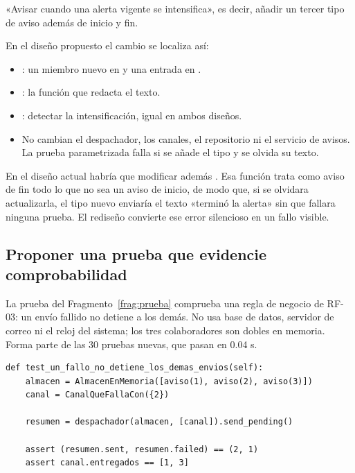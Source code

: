 \documentclass[11pt,a4paper]{article}
\begin{document}
 «Avisar cuando una alerta vigente se intensifica», es decir, añadir un tercer tipo de aviso además de inicio y fin.

En el diseño propuesto el cambio se localiza así:
\begin{itemize}
  \item {}: un miembro nuevo en  y una entrada en .
  \item {}: la función que redacta el texto.
  \item {}: detectar la intensificación, igual en ambos diseños.
  \item No cambian el despachador, los canales, el repositorio ni el servicio de avisos. La prueba parametrizada  falla si se añade el tipo y se olvida su texto.
\end{itemize}

En el diseño actual habría que modificar además . Esa función trata como aviso de fin todo lo que no sea un aviso de inicio, de modo que, si se olvidara actualizarla, el tipo nuevo enviaría el texto «terminó la alerta» sin que fallara ninguna prueba. El rediseño convierte ese error silencioso en un fallo visible.

\subsection{Proponer una prueba que evidencie comprobabilidad}

La prueba del Fragmento~\ref{frag:prueba} comprueba una regla de negocio de RF-03: un envío fallido no detiene a los demás. No usa base de datos, servidor de correo ni el reloj del sistema; los tres colaboradores son dobles en memoria. Forma parte de las 30 pruebas nuevas, que pasan en 0.04 s.

\begin{lstlisting}[float=htbp,caption={Prueba aislada con dobles (\cod{tests/unit/test\_notification\_dispatcher.py}).},label=frag:prueba]
def test_un_fallo_no_detiene_los_demas_envios(self):
    almacen = AlmacenEnMemoria([aviso(1), aviso(2), aviso(3)])
    canal = CanalQueFallaCon({2})

    resumen = despachador(almacen, [canal]).send_pending()

    assert (resumen.sent, resumen.failed) == (2, 1)
    assert canal.entregados == [1, 3]
\end{lstlisting}
\end{document}
